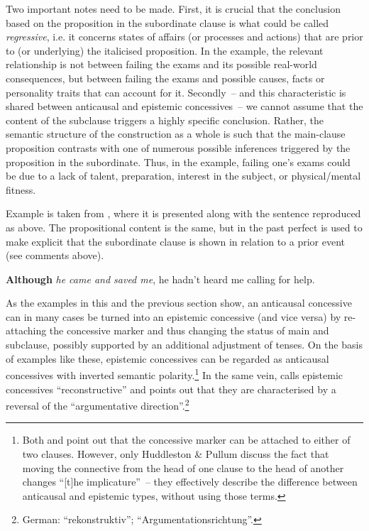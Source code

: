 Two important notes need to be made. First, it is crucial that the conclusion based on the proposition in the subordinate clause is what could be called \textit{regressive}, i.e. it concerns states of affairs (or processes and actions) that are prior to (or underlying) the italicised proposition. In the example, the relevant relationship is not between failing the exams and its possible real-world consequences, but between failing the exams and possible causes, facts or personality traits that can account for it. Secondly~– and this characteristic is shared between anticausal and epistemic concessives~– we cannot assume that the content of the subclause triggers a highly specific conclusion. Rather, the semantic structure of the construction as a whole is such that the main-clause proposition contrasts with one of numerous possible inferences triggered by the proposition in the subordinate. Thus, in the example, failing one’s exams could be due to a lack of talent, preparation, interest in the subject, or physical/mental fitness.

Example  is taken from \citet[79]{Sweetser1990}, where it is presented along with the sentence reproduced as  above. The propositional content is the same, but in  the past perfect is used to make explicit that the subordinate clause is shown in relation to a prior event (see comments above).

\ea\label{ex:16}   \label{bkm:Ref489005139}\textbf{Although} \textit{he came and saved me}, he hadn’t heard me calling for help.\\
\z

As the examples in this and the previous section show, an anticausal concessive can in many cases be turned into an epistemic concessive (and vice versa) by re-attaching the concessive marker and thus changing the status of main and subclause, possibly supported by an additional adjustment of tenses. On the basis of examples like these, epistemic concessives can be regarded as anticausal concessives with inverted semantic polarity.\footnote{Both \citet[1098]{QuirkEtAl1985} and    \citet[735]{HuddlestonPullum2002} point out that the concessive marker can be attached to either of two clauses. However, only Huddleston \& Pullum discuss the fact that moving the connective from the head of one clause to the head of another changes “[t]he implicature”~– they effectively describe the difference between anticausal and epistemic types, without using those terms.} In the same vein, \citet[345–346]{DiMeola1998} calls epistemic concessives “reconstructive” and points out that they are characterised by a reversal of the “argumentative direction”.\footnote{German: “rekonstruktiv”; “Argumentationsrichtung”.}

